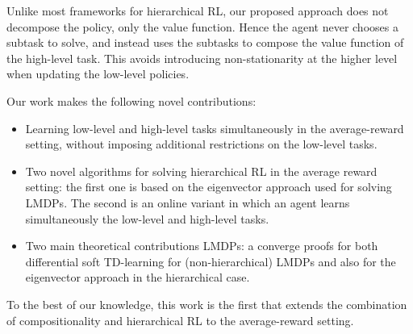 
Unlike most frameworks for hierarchical RL, our proposed approach does not decompose the policy, only the value function. Hence the agent never chooses a subtask to solve, and instead uses the subtasks to compose the value function of the high-level task. 
This avoids introducing non-stationarity at the higher level when updating the low-level policies.

Our work makes the following novel contributions:
\begin{itemize}
  \item Learning low-level and high-level tasks simultaneously in the average-reward setting, without imposing additional restrictions on the low-level tasks.
    \item Two novel algorithms for solving hierarchical RL in the average reward setting: the first one is based on the eigenvector approach used for solving LMDPs. The second is an online variant in which an agent learns simultaneously the low-level and high-level tasks.
    \item Two main theoretical contributions LMDPs: a converge proofs for both differential soft TD-learning for (non-hierarchical) LMDPs and also for the eigenvector approach in the hierarchical case.
\end{itemize}

To the best of our knowledge, this work is the first that extends the combination of compositionality and hierarchical RL to the average-reward setting.

